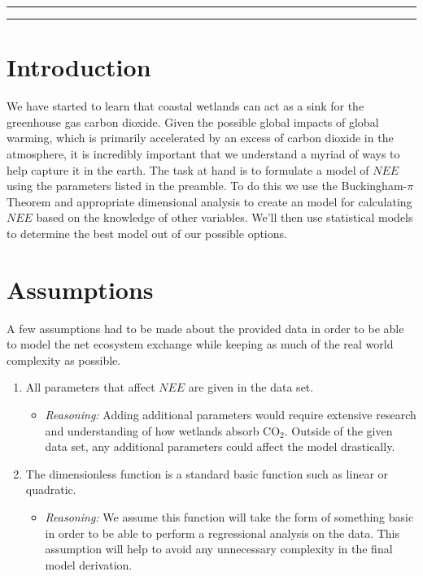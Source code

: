 \documentclass{article}
\begin{document}
\vspace{15pt}
\hrule
\vspace{5pt}
\hrule
\vspace{15pt}

\section{Introduction}We have started to learn that coastal wetlands can act as a sink for the greenhouse gas carbon dioxide. Given the possible global impacts of global warming, which is primarily accelerated by an excess of carbon dioxide in the atmosphere, it is incredibly important that we understand a myriad of ways to help capture it in the earth. The task at hand is to formulate a model of $NEE$ using the parameters listed in the preamble. To do this we use the Buckingham-$\pi$ Theorem and appropriate dimensional analysis to create an model for calculating $NEE$ based on the knowledge of other variables. We'll then use statistical models to determine the best model out of our possible options.


\section{Assumptions} 
A few assumptions had to be made about the provided data in order to be able to model the net ecosystem exchange while keeping as much of the real world complexity as possible.

\begin{enumerate}
\vspace{-2.5mm}
    \item All parameters that affect $NEE$ are given in the data set.
    \begin{itemize}
    \vspace{-2.5mm}
    \item \textit{Reasoning:} Adding additional parameters would require extensive research and understanding of how wetlands absorb CO$_2$. Outside of the given data set, any additional parameters could affect the model drastically.
    \end{itemize}
    \vspace{-2.5mm}
    
    \item The dimensionless function is a standard basic function such as linear or quadratic.
    \begin{itemize}
    \vspace{-2.5mm}
    \item \textit{Reasoning:} We assume this function will take the form of something basic in order to be able to perform a regressional analysis on the data. This assumption will help to avoid any unnecessary complexity in the final model derivation.
    \end{itemize}
    \vspace{-2.5mm}
    
\end{enumerate}
\end{document}
